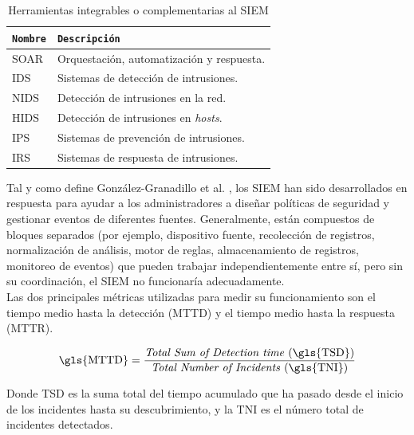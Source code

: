 \begin{table}[h]
    \centering
    \footnotesize
    \begin{tabular}{|l|p{10cm}|}
        \hline
        \rowcolor{graylight}\texttt{Nombre} & \texttt{Descripción} \\
        \hline
        \gls{SOAR} & Orquestación, automatización y respuesta. \\
        \hline
        \gls{IDS} & Sistemas de detección de intrusiones. \\
        \hline
        \gls{NIDS} & Detección de intrusiones en la red. \\
        \hline
        \gls{HIDS} & Detección de intrusiones en \textit{hosts}. \\
        \hline
        \gls{IPS} & Sistemas de prevención de intrusiones. \\
        \hline
        \gls{IRS} & Sistemas de respuesta de intrusiones. \\
        \hline
    \end{tabular}
    \caption{Herramientas integrables o complementarias al SIEM}
    \label{tab:integrables_siem}
\end{table}

\newpage

Tal y como define González-Granadillo et al. \cite{s21144759}, los \gls{SIEM} han sido desarrollados en respuesta para ayudar a los administradores a diseñar políticas de seguridad y gestionar eventos de diferentes fuentes. Generalmente, están compuestos de bloques separados (por ejemplo, dispositivo fuente, recolección de registros, normalización de análisis, motor de reglas, almacenamiento de registros, monitoreo de eventos) que pueden trabajar independientemente entre sí, pero sin su coordinación, el \gls{SIEM} no funcionaría adecuadamente. \\

Las dos principales métricas utilizadas \cite{plextrac2024} para medir su funcionamiento son el tiempo medio hasta la detección (\gls{MTTD}) y el tiempo medio hasta la respuesta (\gls{MTTR}).

\begin{equation}
\text{\gls{MTTD}} = \frac{\text{\textit{Total Sum of Detection time} (\gls{TSD})}}{\text{\textit{Total Number of Incidents} (\gls{TNI})}}
\end{equation}

Donde \gls{TSD} es la suma total del tiempo acumulado que ha pasado desde el inicio de los incidentes hasta su descubrimiento, y la \gls{TNI} es el número total de incidentes detectados.

